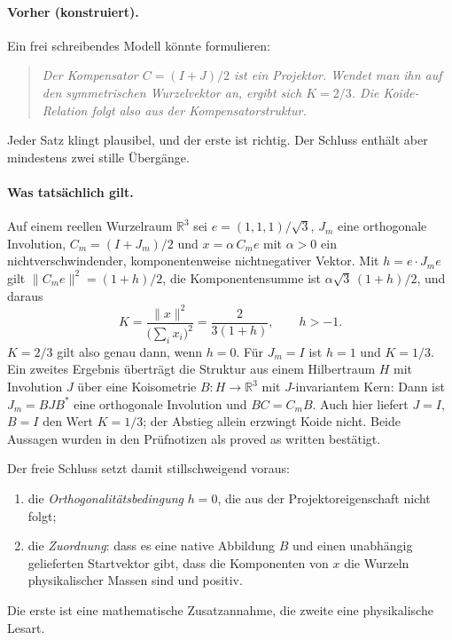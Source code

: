 \paragraph{Vorher (konstruiert).} Ein frei schreibendes Modell könnte formulieren:
\begin{quote}\itshape
\glqq Der Kompensator \(C=(I+J)/2\) ist ein Projektor. Wendet man ihn auf den symmetrischen Wurzelvektor an, ergibt sich \(K=2/3\). Die
Koide-Relation folgt also aus der Kompensatorstruktur.\grqq
\end{quote}
Jeder Satz klingt plausibel, und der erste ist richtig. Der Schluss enthält aber mindestens zwei stille Übergänge.

\paragraph{Was tatsächlich gilt.} Auf einem reellen Wurzelraum \(\mathbb R^3\) sei \(e=(1,1,1)/\sqrt3\), \(J_m\) eine orthogonale Involution,
\(C_m=(I+J_m)/2\) und \(x=\alpha\,C_m e\) mit \(\alpha>0\) ein nichtverschwindender, komponentenweise nichtnegativer Vektor. Mit
\(h=e\cdot J_m e\) gilt \(\lVert C_m e\rVert^2=(1+h)/2\), die Komponentensumme ist \(\alpha\sqrt3\,(1+h)/2\), und daraus
\[
K=\frac{\lVert x\rVert^2}{\bigl(\sum_i x_i\bigr)^2}=\frac{2}{3(1+h)},\qquad h>-1 .
\]
\(K=2/3\) gilt also genau dann, wenn \(h=0\). Für \(J_m=I\) ist \(h=1\) und \(K=1/3\). Ein zweites Ergebnis überträgt die Struktur aus einem
Hilbertraum \(H\) mit Involution \(J\) über eine Koisometrie \(B\colon H\to\mathbb R^3\) mit \(J\)-invariantem Kern: Dann ist \(J_m=BJB^*\) eine
orthogonale Involution und \(BC=C_mB\). Auch hier liefert \(J=I\), \(B=I\) den Wert \(K=1/3\); der Abstieg allein erzwingt Koide nicht. Beide
Aussagen wurden in den Prüfnotizen als \glqq proved as written\grqq{} bestätigt.

Der freie Schluss setzt damit stillschweigend voraus:
\begin{enumerate}[nosep]
\item die \emph{Orthogonalitätsbedingung} \(h=0\), die aus der Projektoreigenschaft nicht folgt;
\item die \emph{Zuordnung}: dass es eine native Abbildung \(B\) und einen unabhängig gelieferten Startvektor gibt, dass die Komponenten von
\(x\) die Wurzeln physikalischer Massen sind und positiv.
\end{enumerate}
Die erste ist eine mathematische Zusatzannahme, die zweite eine physikalische Lesart.


